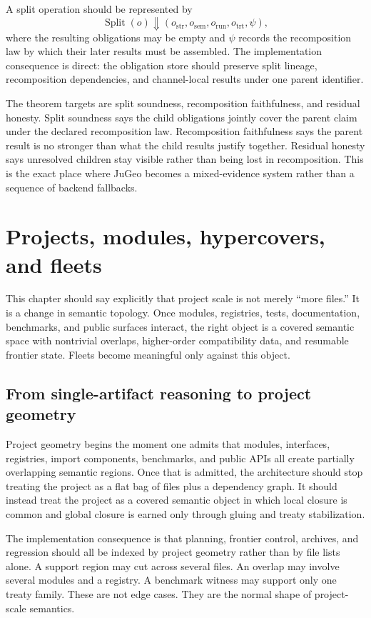 \documentclass[11pt]{report}
\begin{document}
A split operation should be represented by
\[
\operatorname{Split}(o) \Downarrow (o_{\mathrm{str}}, o_{\mathrm{sem}}, o_{\mathrm{run}}, o_{\mathrm{trt}}, \psi),
\]
where the resulting obligations may be empty and $\psi$ records the recomposition law by which their later results must be assembled. The implementation consequence is direct: the obligation store should preserve split lineage, recomposition dependencies, and channel-local results under one parent identifier.

The theorem targets are split soundness, recomposition faithfulness, and residual honesty. Split soundness says the child obligations jointly cover the parent claim under the declared recomposition law. Recomposition faithfulness says the parent result is no stronger than what the child results justify together. Residual honesty says unresolved children stay visible rather than being lost in recomposition. This is the exact place where JuGeo becomes a mixed-evidence system rather than a sequence of backend fallbacks.
\chapter{Projects, modules, hypercovers, and fleets}
This chapter should say explicitly that project scale is not merely ``more files.'' It is a change in semantic topology. Once modules, registries, tests, documentation, benchmarks, and public surfaces interact, the right object is a covered semantic space with nontrivial overlaps, higher-order compatibility data, and resumable frontier state. Fleets become meaningful only against this object.
\section{From single-artifact reasoning to project geometry}
Project geometry begins the moment one admits that modules, interfaces, registries, import components, benchmarks, and public APIs all create partially overlapping semantic regions. Once that is admitted, the architecture should stop treating the project as a flat bag of files plus a dependency graph. It should instead treat the project as a covered semantic object in which local closure is common and global closure is earned only through gluing and treaty stabilization.

The implementation consequence is that planning, frontier control, archives, and regression should all be indexed by project geometry rather than by file lists alone. A support region may cut across several files. An overlap may involve several modules and a registry. A benchmark witness may support only one treaty family. These are not edge cases. They are the normal shape of project-scale semantics.
\end{document}
